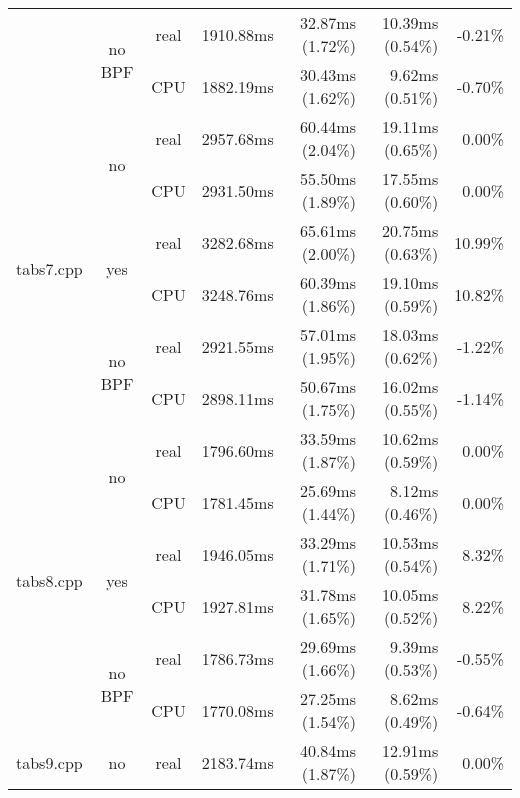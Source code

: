 \documentclass[en]{pracamgr}
\begin{document}
\begin{appendices}
\begin{small}
\begin{longtable}{|l|c|c|r|r|r|r|}
                            \cline{2-7}
                            & \multirow{2}{*}{no BPF} & real & 1910.88ms & 32.87ms (1.72\%) & 10.39ms (0.54\%) & -0.21\% \\*
                            &                         & CPU  & 1882.19ms & 30.43ms (1.62\%) & 9.62ms (0.51\%) & -0.70\% \\
\hline
\multirow{6}{*}{tabs7.cpp}  & \multirow{2}{*}{no}     & real & 2957.68ms & 60.44ms (2.04\%) & 19.11ms (0.65\%) & 0.00\% \\*
                            &                         & CPU  & 2931.50ms & 55.50ms (1.89\%) & 17.55ms (0.60\%) & 0.00\% \\*
                            \cline{2-7}
                            & \multirow{2}{*}{yes}    & real & 3282.68ms & 65.61ms (2.00\%) & 20.75ms (0.63\%) & 10.99\% \\*
                            &                         & CPU  & 3248.76ms & 60.39ms (1.86\%) & 19.10ms (0.59\%) & 10.82\% \\*
                            \cline{2-7}
                            & \multirow{2}{*}{no BPF} & real & 2921.55ms & 57.01ms (1.95\%) & 18.03ms (0.62\%) & -1.22\% \\*
                            &                         & CPU  & 2898.11ms & 50.67ms (1.75\%) & 16.02ms (0.55\%) & -1.14\% \\
\hline
\multirow{6}{*}{tabs8.cpp}  & \multirow{2}{*}{no}     & real & 1796.60ms & 33.59ms (1.87\%) & 10.62ms (0.59\%) & 0.00\% \\*
                            &                         & CPU  & 1781.45ms & 25.69ms (1.44\%) & 8.12ms (0.46\%) & 0.00\% \\*
                            \cline{2-7}
                            & \multirow{2}{*}{yes}    & real & 1946.05ms & 33.29ms (1.71\%) & 10.53ms (0.54\%) & 8.32\% \\*
                            &                         & CPU  & 1927.81ms & 31.78ms (1.65\%) & 10.05ms (0.52\%) & 8.22\% \\*
                            \cline{2-7}
                            & \multirow{2}{*}{no BPF} & real & 1786.73ms & 29.69ms (1.66\%) & 9.39ms (0.53\%) & -0.55\% \\*
                            &                         & CPU  & 1770.08ms & 27.25ms (1.54\%) & 8.62ms (0.49\%) & -0.64\% \\
\hline
\multirow{6}{*}{tabs9.cpp}  & \multirow{2}{*}{no}     & real & 2183.74ms & 40.84ms (1.87\%) & 12.91ms (0.59\%) & 0.00\% \\*

\end{longtable}
\end{small}
\end{appendices}
\end{document}
